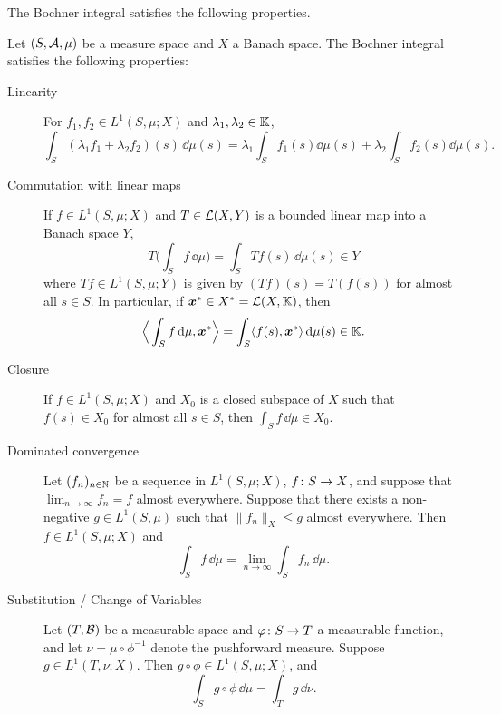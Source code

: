 The Bochner integral satisfies the following properties.
\begin{prop}
  Let $(S,\mathcal{A},\mu)$ be a measure space and $X$ a Banach space.
  The Bochner integral satisfies the following properties:
  \begin{description}
  \item[Linearity] For $f_1, f_2 \in L^1(S,\mu;X)$ and $\lambda_1, \lambda_2 \in \mathbb{K}$,
    \begin{equation*}
      \int_S (\lambda_1 f_1 + \lambda_2 f_2)(s) \, \dd\mu(s) = \lambda_1 \int_S f_1(s) \dd\mu(s) + \lambda_2 \int_S f_2(s) \dd\mu(s) .
    \end{equation*}
  \item[Commutation with linear maps] If $f \in L^1(S,\mu;X)$ and $T \in \mathcal{L}(X,Y)$ is a bounded linear map into a Banach space $Y$,
    \begin{equation*}
      T\Big( \int_S f \, \dd\mu \Big) = \int_S Tf(s) \, \dd\mu(s) \in Y
    \end{equation*}
    where $Tf \in L^1(S,\mu;Y)$ is given by $(Tf)(s) = T(f(s))$ for almost all $s \in S$.
    In particular, if $\bm{x}^* \in X^* = \mathcal{L}(X,\mathbb{K})$, then
    \begin{equation*}
      \Big\langle \int_S f \, \mathrm{d}\mu, \bm{x}^* \Big\rangle = \int_S \langle f(s), \bm{x}^* \rangle \, \mathrm{d}\mu(s) \in \mathbb{K}.
    \end{equation*}
  \item[Closure] If $f \in L^1(S,\mu;X)$ and $X_0$ is a closed subspace of $X$ such that $f(s) \in X_0$ for almost all $s \in S$, then $\int_S f \, \dd\mu \in X_0$.
  \item[Dominated convergence] Let $(f_n)_{n \in \mathbb{N}}$ be a sequence in $L^1(S,\mu;X)$, $f \colon S \rightarrow X$, and suppose that $\lim_{n \to \infty} f_n = f$ almost everywhere.
    Suppose that there exists a non-negative $g \in L^1(S,\mu)$ such that $\|f_n\|_X \leq g$ almost everywhere.
    Then $f \in L^1(S,\mu;X)$ and
    \begin{equation*}
      \int_S f \, \dd\mu = \lim_{n \to \infty} \int_S f_n \, \dd\mu.
    \end{equation*}
  \item[Substitution / Change of Variables]
    Let $(T,\mathcal{B})$ be a measurable space and $\varphi \colon S \rightarrow T$ a measurable function, and let $\nu = \mu \circ \phi^{-1}$ denote the pushforward measure.
    Suppose $g \in L^1(T,\nu;X)$.
    Then $g \circ \phi \in L^1(S,\mu;X)$, and
    \begin{equation*}
      \int_S g \circ \phi \, \dd\mu = \int_T g \, \dd\nu.
    \end{equation*}
    
  \end{description}
\end{prop}

